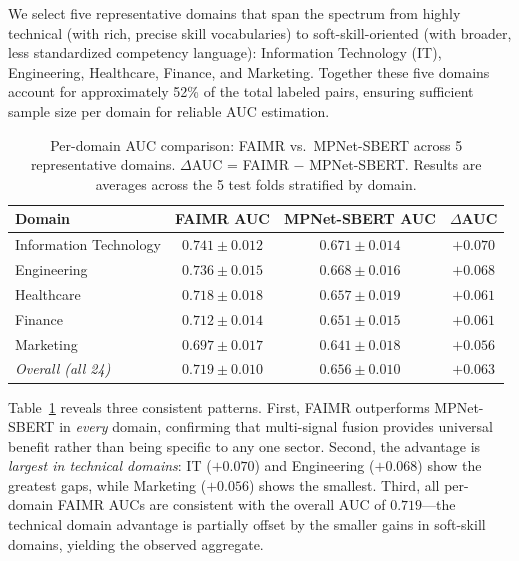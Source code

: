 \documentclass[smallcondensed,numbers]{sn-jnl}
\begin{document}
We select five representative domains that span the spectrum from highly technical (with rich, precise skill vocabularies) to soft-skill-oriented (with broader, less standardized competency language): Information Technology (IT), Engineering, Healthcare, Finance, and Marketing. Together these five domains account for approximately 52\% of the total labeled pairs, ensuring sufficient sample size per domain for reliable AUC estimation.

\begin{table}[t]
\centering
\caption{Per-domain AUC comparison: FAIMR vs.\ MPNet-SBERT across 5 representative domains. $\Delta$AUC = FAIMR $-$ MPNet-SBERT. Results are averages across the 5 test folds stratified by domain.}
\label{tab:crossdomain}
\begin{tabular}{lccc}
\toprule
Domain & FAIMR AUC & MPNet-SBERT AUC & $\Delta$AUC \\
\midrule
Information Technology & $0.741 \pm 0.012$ & $0.671 \pm 0.014$ & $+0.070$ \\
Engineering            & $0.736 \pm 0.015$ & $0.668 \pm 0.016$ & $+0.068$ \\
Healthcare             & $0.718 \pm 0.018$ & $0.657 \pm 0.019$ & $+0.061$ \\
Finance                & $0.712 \pm 0.014$ & $0.651 \pm 0.015$ & $+0.061$ \\
Marketing              & $0.697 \pm 0.017$ & $0.641 \pm 0.018$ & $+0.056$ \\
\midrule
\textit{Overall (all 24)} & $0.719 \pm 0.010$ & $0.656 \pm 0.010$ & $+0.063$ \\
\bottomrule
\end{tabular}
\end{table}

Table~\ref{tab:crossdomain} reveals three consistent patterns. First, FAIMR outperforms MPNet-SBERT in \textit{every} domain, confirming that multi-signal fusion provides universal benefit rather than being specific to any one sector. Second, the advantage is \textit{largest in technical domains}: IT ($+0.070$) and Engineering ($+0.068$) show the greatest gaps, while Marketing ($+0.056$) shows the smallest. Third, all per-domain FAIMR AUCs are consistent with the overall AUC of $0.719$---the technical domain advantage is partially offset by the smaller gains in soft-skill domains, yielding the observed aggregate.
\end{document}
